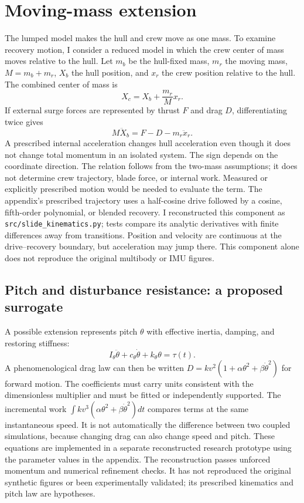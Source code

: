 \documentclass[11pt]{article}
\begin{document}
\section{Moving-mass extension}
The lumped model makes the hull and crew move as one mass. To examine recovery motion, I consider a reduced model in which the crew center of mass moves relative to the hull. Let $m_b$ be the hull-fixed mass, $m_r$ the moving mass, $M=m_b+m_r$, $X_b$ the hull position, and $x_r$ the crew position relative to the hull. The combined center of mass is
\begin{equation}X_c=X_b+\frac{m_r}{M}x_r.\end{equation}
If external surge forces are represented by thrust $F$ and drag $D$, differentiating twice gives
\begin{equation}M\ddot X_b=F-D-m_r\ddot x_r.\end{equation}
A prescribed internal acceleration changes hull acceleration even though it does not change total momentum in an isolated system. The sign depends on the coordinate direction. The relation follows from the two-mass assumptions; it does not determine crew trajectory, blade force, or internal work. Measured or explicitly prescribed motion would be needed to evaluate the term. The appendix's prescribed trajectory uses a half-cosine drive followed by a cosine, fifth-order polynomial, or blended recovery. I reconstructed this component as \texttt{src/slide\_kinematics.py}; tests compare its analytic derivatives with finite differences away from transitions. Position and velocity are continuous at the drive--recovery boundary, but acceleration may jump there. This component alone does not reproduce the original multibody or IMU figures.

\subsection{Pitch and disturbance resistance: a proposed surrogate}
A possible extension represents pitch $\theta$ with effective inertia, damping, and restoring stiffness:
\begin{equation}I_\theta\ddot\theta+c_\theta\dot\theta+k_\theta\theta=\tau(t).\end{equation}
A phenomenological drag law can then be written $D=kv^2(1+\alpha\theta^2+\beta\dot\theta^2)$ for forward motion. The coefficients must carry units consistent with the dimensionless multiplier and must be fitted or independently supported. The incremental work $\int kv^3(\alpha\theta^2+\beta\dot\theta^2)dt$ compares terms at the same instantaneous speed. It is not automatically the difference between two coupled simulations, because changing drag can also change speed and pitch. These equations are implemented in a separate reconstructed research prototype using the parameter values in the appendix. The reconstruction passes unforced momentum and numerical refinement checks. It has not reproduced the original synthetic figures or been experimentally validated; its prescribed kinematics and pitch law are hypotheses.
\end{document}
